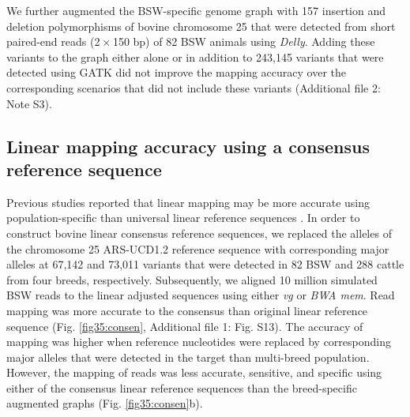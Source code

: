 \documentclass[../main.tex]{subfiles}
\begin{document}
We further augmented the BSW-specific genome graph with 157 insertion and deletion polymorphisms of bovine chromosome 25 that were detected from short paired-end reads (2 $×$ 150 bp) of 82 BSW animals using \emph{Delly}. Adding these variants to the graph either alone or in addition to 243,145 variants that were detected using GATK did not improve the mapping accuracy over the corresponding scenarios that did not include these variants (Additional file 2: Note S3).

\subsection*{Linear mapping accuracy using a consensus reference sequence}

Previous studies reported that linear mapping may be more accurate using population-specific than universal linear reference sequences \citep{ballouz2019time,shukla2019hg19kindel,dewey2011phased}. In order to construct bovine linear consensus reference sequences, we replaced the alleles of the chromosome 25 ARS-UCD1.2 reference sequence with corresponding major alleles at 67,142 and 73,011 variants that were detected in 82 BSW and 288 cattle from four breeds, respectively. Subsequently, we aligned 10 million simulated BSW reads to the linear adjusted sequences using either \emph{vg} or \emph{BWA mem}. Read mapping was more accurate to the consensus than original linear reference sequence (Fig. \ref{fig35:consen}, Additional file 1: Fig. S13). The accuracy of mapping was higher when reference nucleotides were replaced by corresponding major alleles that were detected in the target than multi-breed population. However, the mapping of reads was less accurate, sensitive, and specific using either of the consensus linear reference sequences than the breed-specific augmented graphs (Fig. \ref{fig35:consen}b).
\end{document}
